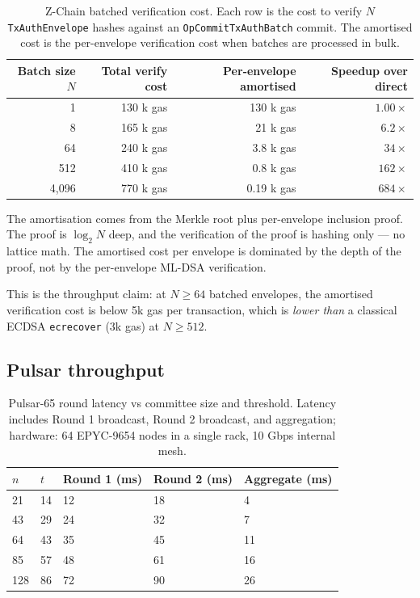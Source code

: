 \begin{table}[H]
\centering
\caption{Z-Chain batched verification cost. Each row is the cost to
verify $N$ \texttt{TxAuthEnvelope} hashes against an
\texttt{OpCommitTxAuthBatch} commit. The amortised cost is the
per-envelope verification cost when batches are processed in bulk.}
\label{tab:zchain-batch}
\begin{tabular}{rrrr}
\toprule
Batch size $N$ & Total verify cost & Per-envelope amortised & Speedup over direct \\
\midrule
1       & 130 k gas    & 130 k gas    & $1.00\times$ \\
8       & 165 k gas    & 21 k gas     & $6.2\times$ \\
64      & 240 k gas    & 3.8 k gas    & $34\times$ \\
512     & 410 k gas    & 0.8 k gas    & $162\times$ \\
4{,}096 & 770 k gas    & 0.19 k gas   & $684\times$ \\
\bottomrule
\end{tabular}
\end{table}

The amortisation comes from the Merkle root plus per-envelope inclusion
proof. The proof is $\log_2 N$ deep, and the verification of the proof is
hashing only --- no lattice math. The amortised cost per envelope is
dominated by the depth of the proof, not by the per-envelope ML-DSA
verification.

This is the throughput claim: at $N \ge 64$ batched envelopes, the
amortised verification cost is below 5k gas per transaction, which is
\emph{lower than} a classical ECDSA \texttt{ecrecover} (3k gas) at $N \ge
512$.

\subsection{Pulsar throughput}

\begin{table}[H]
\centering
\caption{Pulsar-65 round latency vs committee size and threshold.
Latency includes Round 1 broadcast, Round 2 broadcast, and aggregation;
hardware: 64 EPYC-9654 nodes in a single rack, 10 Gbps internal mesh.}
\label{tab:pulsar-throughput}
\begin{tabular}{lllll}
\toprule
$n$ & $t$ & Round 1 (ms) & Round 2 (ms) & Aggregate (ms) \\
\midrule
21  & 14 & 12 & 18 & 4 \\
43  & 29 & 24 & 32 & 7 \\
64  & 43 & 35 & 45 & 11 \\
85  & 57 & 48 & 61 & 16 \\
128 & 86 & 72 & 90 & 26 \\
\bottomrule
\end{tabular}
\end{table}

